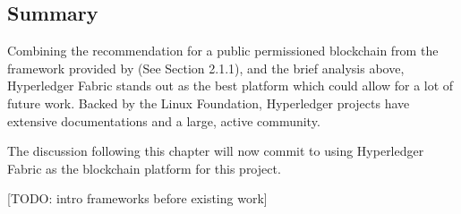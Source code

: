 \subsection*{Summary}

Combining the recommendation for a public permissioned blockchain from the framework provided
by \citet{wust2017you} (See Section 2.1.1), and the brief analysis above, Hyperledger Fabric
stands out as the best platform which could allow for a lot of future work. Backed by the
Linux Foundation, Hyperledger projects have extensive documentations and a large,
active community.

The discussion following this chapter will now commit to using Hyperledger
Fabric as the blockchain platform for this project.

[TODO: intro frameworks before existing work]

